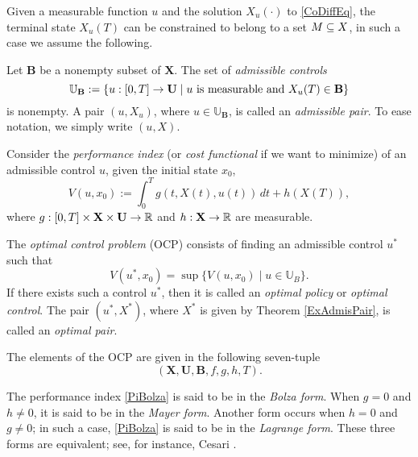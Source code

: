 	Given a measurable function $u$ and the solution $X_u(\cdot)$ to 
\eqref{CoDiffEq}, the terminal state $X_u(T)$ can be constrained to belong to a set $M\subseteq X$, in such a case we assume the following. 

\begin{assumption}\rm Let $\mathbf{B}$ be a nonempty subset of $\mathbf{X}$. 
	The set of {\it admissible controls} 
	\begin{equation}\label{FeasCont}  
		 \mathbb{U}_\mathbf{B}:=\{u:[0,T]\to \mathbf{U}\mid u\  
		 \mbox{\rm is measurable and } X_u(T)\in \mathbf{B}\} 
	\end{equation}
	is nonempty. A pair $(u,X_u)$, where $u\in \mathbb{U}_\mathbf{B}$, is called an 
	{\it admissible pair}. To ease notation, we simply write $(u,X)$.
\end{assumption}


Consider the {\it performance index} (or {\it cost functional} if we want to minimize) of an admissible control $u$, given the initial state $x_0$, 
        \begin{equation}\label{PiBolza} V(u,x_0) := \int_0^Tg(t,X(t),u(t))\,dt + h(X(T)),\end{equation}
where $g:[0,T]\times \mathbf{X}\times \mathbf{U}\to \mathbb{R}$ and $h:\mathbf{X}\to\mathbb{R}$ are measurable.

The {\it optimal control problem} (OCP) consists of finding an admissible control $u^\ast$ such that
\[ V(u^\ast,x_0)=\sup\{ V(u,x_0)\mid u\in \mathbb{U}_B \}.\]
If there exists such a control $u^\ast$, then it is called an {\it optimal policy} or {\it optimal control}. The pair $(u^\ast,X^\ast)$, where $X^\ast$ is given by Theorem \ref{ExAdmisPair}, is called an {\it optimal pair}.

The elements of the OCP are given in the following seven-tuple 
   \begin{equation}\label{OCP}
       (\mathbf{X},\mathbf{U},\mathbf{B},f,g,h,T).
   \end{equation}



\begin{remark}\rm
The performance index \eqref{PiBolza} is said to be in the {\it Bolza form}. When $g= 0$ and $h\neq 0$, it is said to be in the {\it Mayer form}. Another form occurs when $h= 0$ and $g\neq 0$; in such a case, \eqref{PiBolza} is said to be in the {\it Lagrange form}. These three forms are equivalent; see, for instance, Cesari \cite[Sect. 1.9]{Cesari83}. 
\end{remark} 

